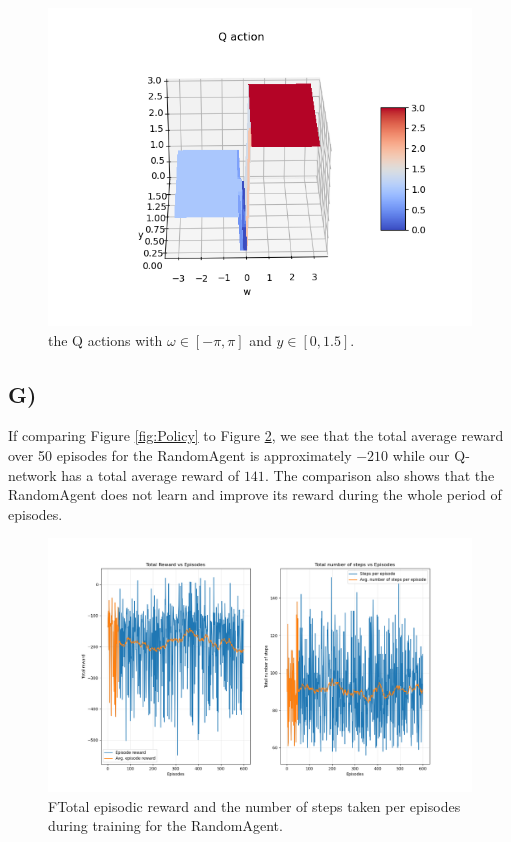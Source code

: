 \documentclass{article}
\begin{document}
\begin{figure}[H]
    \centering
    \includegraphics[width=1\textwidth]{Lab_2/problem1/images/Q_action_2.png}    \caption{\small the Q actions with $\omega \in [-\pi,\pi] $ and $y \in [0, 1.5]$.}
    \label{fig:Q_action}
\end{figure}

\subsection*{G)}
If comparing Figure \ref{fig:Policy} to Figure \ref{fig:randomAgent}, we see that the total average reward over 50 episodes for the RandomAgent is approximately $-210$ while our Q-network has a total average reward of $141$. The comparison also shows that the RandomAgent does not learn and improve its reward during the whole period of episodes.
\begin{figure}[H]
    \centering
    \includegraphics[width=1\textwidth]{Lab_2/problem1/images/randomAgent.png}
    \caption{\small FTotal episodic reward and the number of steps taken per episodes during training for the RandomAgent.  }
    \label{fig:randomAgent}
\end{figure}
\end{document}
